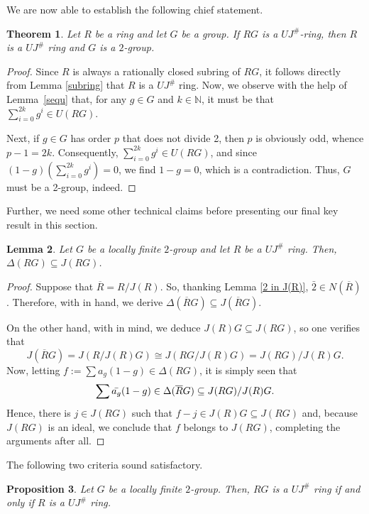 \documentclass[12pt]{amsart}
\newtheorem{theorem}{Theorem}[section]
\newtheorem{proposition}[theorem]{Proposition}
\newtheorem{lemma}[theorem]{Lemma}
\theoremstyle{definition}
\begin{document}
We are now able to establish the following chief statement.

\begin{theorem}\label{UQgroupring}
Let $R$ be a ring and let $G$ be a group. If $RG$ is a $UJ^{\#}$-ring, then $R$ is a $UJ^{\#}$ ring and $G$ is a $2$-group.
\end{theorem}

\begin{proof}
Since $R$ is always a rationally closed subring of $RG$, it follows directly from Lemma \ref{subring} that $R$ is a $UJ^{\#}$ ring. Now, we observe with the help of Lemma~\ref{sequ} that, for any \( g \in G \) and \( k \in \mathbb{N} \), it must be that \( \sum_{i=0}^{2k} g^i \in U(RG) \). 
	
Next, if \( g \in G \) has order \( p \) that does not divide 2, then \( p \) is obviously odd, whence \( p-1=2k \). Consequently, \(\sum_{i=0}^{2k} g^i \in U(RG)\), and since \( (1-g)(\sum_{i=0}^{2k} g^i)=0 \), we find \( 1-g=0 \), which is a contradiction. Thus, \( G \) must be a 2-group, indeed.
\end{proof}

Further, we need some other technical claims before presenting our final key result in this section.

\begin{lemma}\label{Delta subset Jaco}
Let $G$ be a locally finite $2$-group and let $R$ be a $UJ^{\#}$ ring. Then, $\Delta(RG) \subseteq J(RG)$.
\end{lemma}

\begin{proof}
Suppose that $\overline{R}=R/J(R)$. So, thanking Lemma \ref{2 in J(R)}, $\bar{2} \in N(\overline{R})$. Therefore, with \cite[Proposition 16]{con} in hand, we derive $\Delta(\overline{R}G) \subseteq J(\overline{R}G)$.
	
On the other hand, with \cite[Lemma 4]{chennot} in mind, we deduce $J(R)G \subseteq J(RG)$, so one verifies that $$J(\overline{R}G)=J(R/J(R)G) \cong J(RG/J(R)G)=J(RG)/J(R)G.$$
Now, letting $f:=\sum a_g(1-g) \in \Delta(RG)$, it is simply seen that $$\sum \Bar{a_g}(1-g) \in  \Delta(\overline{R}G) \subseteq J(RG)/J(R)G.$$ Hence, there is $j \in J(RG)$ such that $f-j \in J(R)G \subseteq J(RG)$ and, because $J(RG)$ is an ideal, we conclude that $f$ belongs to $J(RG)$, completing the arguments after all.
\end{proof}

The following two criteria sound satisfactory.

\begin{proposition}\label{locallyfinite}
Let $G$ be a locally finite $2$-group. Then, $RG$ is a $UJ^{\#}$ ring if and only if $R$ is a $UJ^{\#}$ ring.
\end{proposition}
\end{document}
